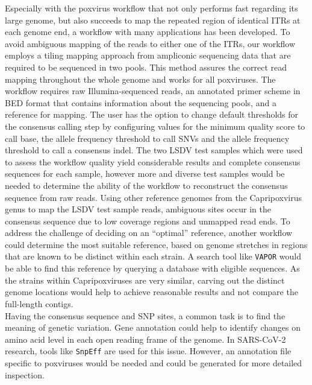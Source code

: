 Especially with the poxvirus workflow that not only performs fast regarding its large genome, but also succeeds to map the repeated region of identical \acp{ITR} at each genome end, a workflow with many applications has been developed. To avoid ambiguous mapping of the reads to either one of the \acp{ITR}, our workflow employs a tiling mapping approach from ampliconic sequencing data that are required to be sequenced in two pools. This method assures the correct read mapping throughout the whole genome and works for all poxviruses. The workflow requires raw Illumina-sequenced reads, an annotated primer scheme in \ac{BED} format that contains information about the sequencing pools, and a reference for mapping. The user has the option to change default thresholds for the consensus calling step by configuring values for the minimum quality score to call base, the allele frequency threshold to call \acp{SNV} and the allele frequency threshold to call a consensus indel. The two \ac{LSDV} test samples which were used to assess the workflow quality yield considerable results and complete consensus sequences for each sample, however more and diverse test samples would be needed to determine the ability of the workflow to reconstruct the consensus sequence from raw reads. Using other reference genomes from the Capripoxvirus genus to map the \ac{LSDV} test sample reads, ambiguous sites occur in the consensus sequence due to low coverage regions and unmapped read ends. To address the challenge of deciding on an ``optimal'' reference, another workflow could determine the most suitable reference, based on genome stretches in regions that are known to be distinct within each strain. A search tool like \texttt{VAPOR} would be able to find this reference by querying a database with eligible sequences. As the strains within Capripoxviruses are very similar, carving out the distinct genome locations would help to achieve reasonable results and not compare the full-length contigs.\\
Having the consensus sequence and \ac{SNP} sites, a common task is to find the meaning of genetic variation. Gene annotation could help to identify changes on amino acid level in each open reading frame of the genome. In \ac{SARS-CoV-2} research, tools like \texttt{SnpEff} are used for this issue. However, an annotation file specific to poxviruses would be needed and could be generated for more detailed inspection.

